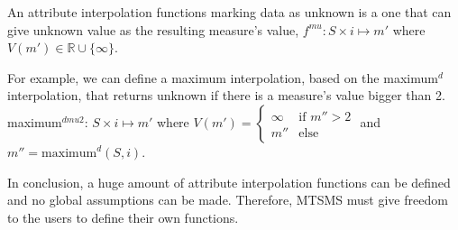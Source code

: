 An attribute interpolation functions marking data as unknown is a one
that can give unknown value as the resulting measure's value, $f^{mu}:
S \times i \mapsto m'$ where $V(m')\in \mathbb{R}\cup\{\infty\}$.

For example, we can define a maximum interpolation, based on the
maximum$^d$ interpolation, that returns unknown if there is a
measure's value bigger than 2.  maximum$^{dmu2}$: $S \times i
\mapsto m'$ where $V(m') = 
\begin{cases}
  \infty &\text{if }  m''>2\\
  m'' & \text{else }
\end{cases}$ and $m''=\text{maximum}^d(S,i)$.

    
In conclusion, a huge amount of attribute interpolation functions can
be defined and no global assumptions can be made. Therefore, MTSMS
must give freedom to the users to define their own functions.














